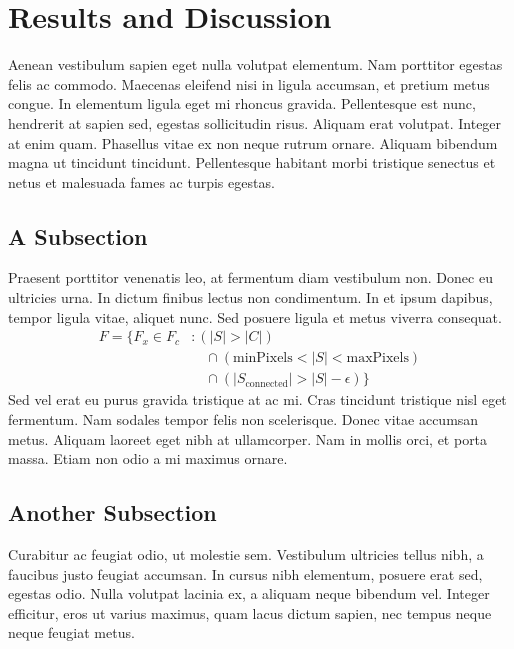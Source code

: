 \documentclass[sigconf,review,anonymous]{acmart}
\begin{document}
\section{Results and Discussion}

Aenean vestibulum sapien eget nulla volutpat elementum. Nam porttitor egestas felis ac commodo. Maecenas eleifend nisi in ligula accumsan, et pretium metus congue. In elementum ligula eget mi rhoncus gravida. Pellentesque est nunc, hendrerit at sapien sed, egestas sollicitudin risus. Aliquam erat volutpat. Integer at enim quam. Phasellus vitae ex non neque rutrum ornare. Aliquam bibendum magna ut tincidunt tincidunt. Pellentesque habitant morbi tristique senectus et netus et malesuada fames ac turpis egestas.

\subsection{A Subsection}

Praesent porttitor venenatis leo, at fermentum diam vestibulum non. Donec eu ultricies urna. In dictum finibus lectus non condimentum. In et ipsum dapibus, tempor ligula vitae, aliquet nunc. Sed posuere ligula et metus viverra consequat. 
\begin{equation}
\begin{split}
F = \{F_{x} \in  F_{c} &: (|S| > |C|) \\
 &\quad \cap (\text{minPixels}  < |S| < \text{maxPixels}) \\
 &\quad \cap (|S_{\text{connected}}| > |S| - \epsilon) \}
\end{split}
\end{equation}
Sed vel erat eu purus gravida tristique at ac mi. Cras tincidunt tristique nisl eget fermentum. Nam sodales tempor felis non scelerisque. Donec vitae accumsan metus. Aliquam laoreet eget nibh at ullamcorper. Nam in mollis orci, et porta massa. Etiam non odio a mi maximus ornare.

\subsection{Another Subsection}

Curabitur ac feugiat odio, ut molestie sem. Vestibulum ultricies tellus nibh, a faucibus justo feugiat accumsan. In cursus nibh elementum, posuere erat sed, egestas odio. Nulla volutpat lacinia ex, a aliquam neque bibendum vel. Integer efficitur, eros ut varius maximus, quam lacus dictum sapien, nec tempus neque neque feugiat metus. 
\end{document}
